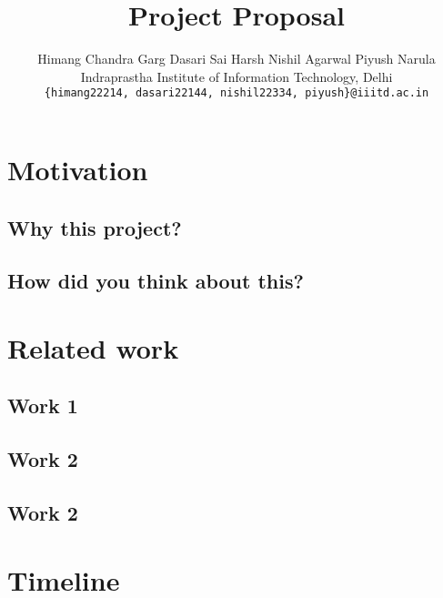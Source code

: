 \documentclass[10pt,twocolumn,letterpaper]{article}
\begin{document}
\title{Project Proposal}

\author{Himang Chandra Garg \qquad Dasari Sai Harsh \qquad Nishil Agarwal \qquad Piyush Narula\\
Indraprastha Institute of Information Technology, Delhi\\
{\tt\small \{himang22214, dasari22144, nishil22334, piyush\}@iiitd.ac.in}
}

\maketitle

\section{Motivation}

\subsection{Why this project?}

\subsection{How did you think about this?}


\section{Related work}

\subsection{Work 1}

\subsection{Work 2}

\subsection{Work 2}

\section{Timeline}
\end{document}

